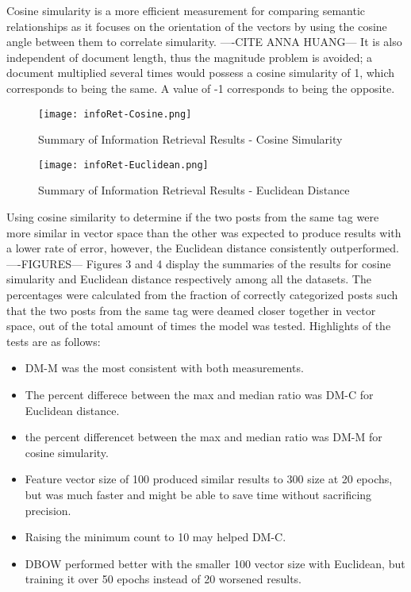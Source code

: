Cosine simularity is a more efficient measurement for comparing semantic relationships as it focuses on the orientation of the vectors by using the cosine angle between them to correlate simularity. ----CITE ANNA HUANG--- It is also independent of document length, thus the magnitude problem is avoided; a document multiplied several times would possess a cosine simularity of 1, which corresponds to being the same. A value of -1 corresponds to being the opposite. 

\begin{figure}[ht]
\caption{Summary of Information Retrieval Results - Cosine Simularity}
\label{results_of_information_retrieval_cosine}
\centering
\texttt{[image: infoRet-Cosine.png]}
\end{figure}

\begin{figure}[ht]
\caption{Summary of Information Retrieval Results - Euclidean Distance}
\label{results_of_information_retrieval_euclidean}
\centering
\texttt{[image: infoRet-Euclidean.png]}
\end{figure}

Using cosine similarity to determine if the two posts from the same tag were more similar in vector space than the other was expected to produce results with a lower rate of error, however, the Euclidean distance consistently outperformed.  ----FIGURES---  Figures 3 and 4 display the summaries of the results for cosine simularity and Euclidean distance respectively among all the datasets. The percentages were calculated from the fraction of correctly categorized posts such that the two posts from the same tag were deamed closer together in vector space, out of the total amount of times the model was tested. Highlights of the tests are as follows:

\begin{itemize}
  \item DM-M was the most consistent with both measurements.
  \item The percent differece between the max and median ratio was DM-C for Euclidean distance.
  \item the percent differencet between the max and median ratio was DM-M for cosine simularity.
  \item Feature vector size of 100 produced similar results to 300 size at 20 epochs, but was much faster and might be able to save time without sacrificing precision.
  \item Raising the minimum count to 10 may helped DM-C.
  \item DBOW performed better with the smaller 100 vector size with Euclidean, but training it over 50 epochs instead of 20 worsened results.
\end{itemize}

